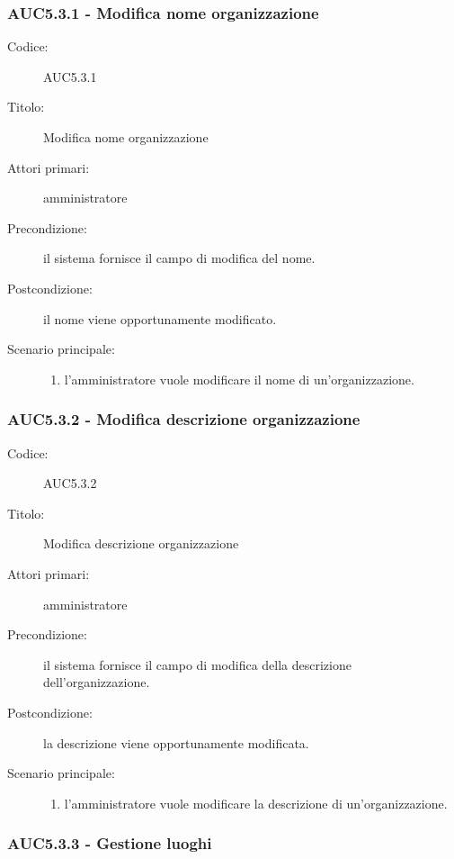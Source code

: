 \documentclass[../../../analisi-dei-requisiti.tex]{subfiles}
\begin{document}
\subsubsection{AUC5.3.1 - Modifica nome organizzazione}%
\label{subsub:AUC5.3.1}
\begin{description}
  \item[Codice:] AUC5.3.1
  \item[Titolo:] Modifica nome organizzazione
  \item[Attori primari:] amministratore
  \item[Precondizione:] il sistema fornisce il campo di modifica del nome.
  \item[Postcondizione:] il nome viene opportunamente modificato.
  \item[Scenario principale:]
  \begin{enumerate}
    \item l'amministratore vuole modificare il nome di un'organizzazione.
  \end{enumerate}
\end{description}

\subsubsection{AUC5.3.2 - Modifica descrizione organizzazione}%
\label{subsub:AUC5.3.2}
\begin{description}
  \item[Codice:] AUC5.3.2
  \item[Titolo:] Modifica descrizione organizzazione
  \item[Attori primari:] amministratore
  \item[Precondizione:] il sistema fornisce il campo di modifica della descrizione dell'organizzazione.
  \item[Postcondizione:] la descrizione viene opportunamente modificata.
  \item[Scenario principale:]
  \begin{enumerate}
    \item l'amministratore vuole modificare la descrizione di un'organizzazione.
  \end{enumerate}
\end{description}

\subsubsection{AUC5.3.3 - Gestione luoghi}%
\label{subsub:AUC5.3.3}
\end{document}
